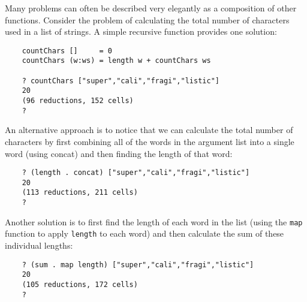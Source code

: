 Many problems can often be described very elegantly as a composition of
other functions.  Consider the problem of calculating the total  number
of characters used in a list of strings.  A simple  recursive  function
provides one solution:
\begin{verbatim}
    countChars []     = 0
    countChars (w:ws) = length w + countChars ws 

    ? countChars ["super","cali","fragi","listic"]
    20
    (96 reductions, 152 cells)
    ?
\end{verbatim}
An alternative approach is to notice that we can  calculate  the  total
number of characters by  first  combining  all  of  the  words  in  the
argument list into a single word (using concat) and  then  finding  the
length of that word:
\begin{verbatim}
    ? (length . concat) ["super","cali","fragi","listic"]
    20
    (113 reductions, 211 cells)
    ?
\end{verbatim}
Another solution is to first find the length of each word in  the  list
(using the \verb"map" function to apply \verb"length"  
to  each  word)  and  then
calculate the sum of these individual lengths:
\begin{verbatim}
    ? (sum . map length) ["super","cali","fragi","listic"]
    20
    (105 reductions, 172 cells)
    ?
\end{verbatim}

